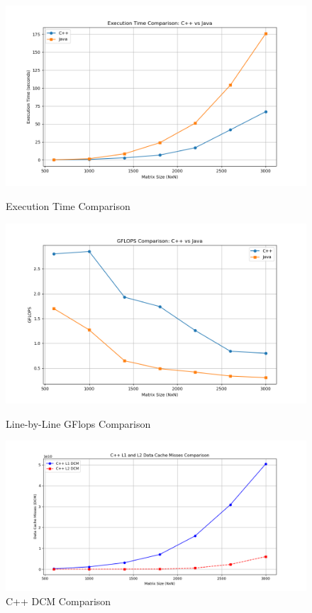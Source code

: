 \documentclass{article}
\begin{document}
\begin{figure}[H]
    \centering
    \begin{minipage}{0.32\textwidth}
        \centering
        \includegraphics[width=\textwidth]{Figure_1.png}
        \caption{\small Execution Time Comparison}
        \label{fig:execution_time}
    \end{minipage}
    \hfill
    \begin{minipage}{0.32\textwidth}
        \centering
        \includegraphics[width=\textwidth]{Figure_2.png}
        \caption{\small Line-by-Line GFlops Comparison}
        \label{fig:flops}
    \end{minipage}
    \hfill
    \begin{minipage}{0.32\textwidth}
        \centering
        \includegraphics[width=\textwidth]{Figure_3.png}
        \caption{\small C++ DCM Comparison}
        \label{fig:cache_misses}
    \end{minipage}
\end{figure}
\end{document}
